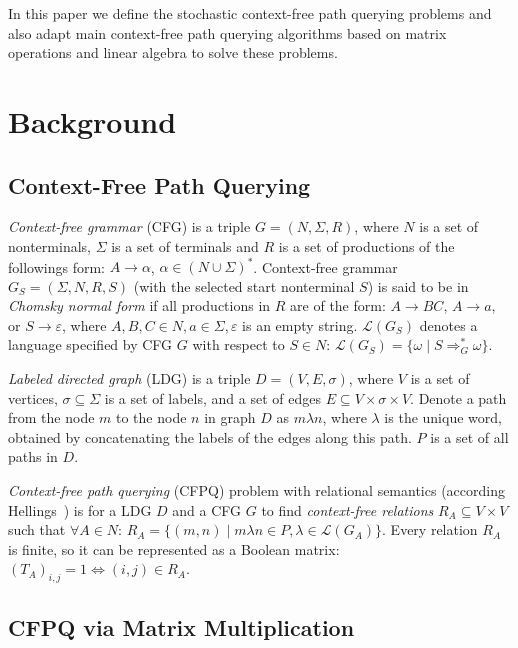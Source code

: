 \documentclass[sigconf, 10pt]{acmart}
\begin{document}
In this paper we define the stochastic context-free path querying problems and also adapt main context-free path querying algorithms based on matrix operations and linear algebra to solve these problems. 

\section{Background}

\subsection{Context-Free Path Querying} 
\emph{Context-free grammar} (CFG) is a triple $G=(N, \Sigma, R)$, where $N$ is a set of nonterminals, $\Sigma$ is a set of terminals and $R$ is a set of productions of the followings form: $A \to \alpha$, $\alpha \in (N \cup \Sigma)^*$.
Context-free grammar $G_S = (\Sigma, N, R, S)$ (with the selected start nonterminal $S$) is said to be in \emph{Chomsky normal form} if all productions in $R$ are of the form: $A \rightarrow BC$, $A \rightarrow a$, or $S \rightarrow \varepsilon$, where $A, B, C \in N, a \in \Sigma, \varepsilon$ is an empty string.
$\mathcal{L}(G_S)$ denotes a language specified by CFG $G$ with respect to $S \in N$: $\mathcal{L}(G_S) = \{\omega \mid S \Rightarrow_{G}^{*} \omega\}$.

\emph{Labeled directed graph} (LDG) is a triple $D = (V,E,\sigma)$, where $V$ is a set of vertices, $\sigma \subseteq \Sigma$ is a set of labels, and a set of edges $E\subseteq V\times \sigma \times V$.
Denote a path from the node $m$ to the node $n$ in graph $D$ as $m\lambda n$, where
$\lambda$ is the unique word, obtained by concatenating the labels of the edges along this path.
$P$ is a set of all paths in $D$.

\emph{Context-free path querying} (CFPQ) problem with relational semantics (according Hellings~\cite{hellings2014conjunctive}) is for a LDG $D$ and a CFG $G$ to find \emph{context-free relations} $R_A \subseteq V \times V$ such that $\forall A \in N$: $R_A = \{(m, n) \mid m\lambda n \in P, \lambda \in \mathcal{L}(G_A)\}.$
Every relation $R_A$ is finite, so it can be represented as a Boolean matrix: $(T_A)_{i,j} = 1 \Leftrightarrow (i,j) \in R_A$.

\subsection{CFPQ via Matrix Multiplication}
\end{document}
